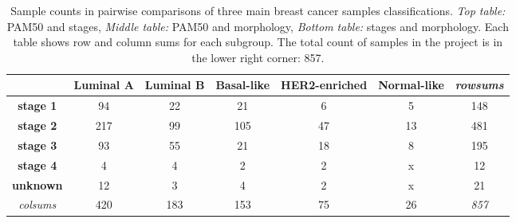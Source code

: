         
                \begin{table}[!h]
                \centering
               \scriptsize
                \caption[Sample counts per each pairwise subgroup in the dataset]{Sample counts in pairwise comparisons of three main breast cancer samples classifications. \textit{Top table:} PAM50 and stages,\textit{ Middle table:} PAM50 and morphology, \textit{Bottom table:} stages and morphology. Each table shows row and column sums for each subgroup. The total count of samples in the project is in the lower right corner: 857.}
                \label{table:counts}      
                \begin{tabular}{ccccccc}
                \multicolumn{1}{l|}{} & \multicolumn{1}{c|}{\textbf{Luminal A}} & \multicolumn{1}{c|}{\textbf{Luminal B}} & \multicolumn{1}{c|}{\textbf{Basal-like}} & \multicolumn{1}{c|}{\textbf{HER2-enriched}} & \multicolumn{1}{c|}{\textbf{Normal-like}} & {\color[HTML]{9B9B9B} \textit{rowsums}} \\ \hline
                \multicolumn{1}{c|}{\textbf{stage 1}} & \multicolumn{1}{c|}{94} & \multicolumn{1}{c|}{22} & \multicolumn{1}{c|}{21} & \multicolumn{1}{c|}{6} & \multicolumn{1}{c|}{5} & \multicolumn{1}{c|}{{\color[HTML]{656565} 148}} \\ \hline
                \multicolumn{1}{c|}{\textbf{stage 2}} & \multicolumn{1}{c|}{217} & \multicolumn{1}{c|}{99} & \multicolumn{1}{c|}{105} & \multicolumn{1}{c|}{47} & \multicolumn{1}{c|}{13} & \multicolumn{1}{c|}{{\color[HTML]{656565} 481}} \\ \hline
                \multicolumn{1}{c|}{\textbf{stage 3}} & \multicolumn{1}{c|}{93} & \multicolumn{1}{c|}{55} & \multicolumn{1}{c|}{21} & \multicolumn{1}{c|}{18} & \multicolumn{1}{c|}{8} & \multicolumn{1}{c|}{{\color[HTML]{656565} 195}} \\ \hline
                \multicolumn{1}{c|}{\textbf{stage 4}} & \multicolumn{1}{c|}{4} & \multicolumn{1}{c|}{4} & \multicolumn{1}{c|}{2} & \multicolumn{1}{c|}{2} & \multicolumn{1}{c|}{{\color[HTML]{656565} x}} & \multicolumn{1}{c|}{{\color[HTML]{656565} 12}} \\ \hline
                \multicolumn{1}{c|}{\textbf{unknown}} & \multicolumn{1}{c|}{12} & \multicolumn{1}{c|}{3} & \multicolumn{1}{c|}{4} & \multicolumn{1}{c|}{2} & \multicolumn{1}{c|}{{\color[HTML]{656565} x}} & \multicolumn{1}{c|}{{\color[HTML]{656565} 21}} \\ \hline
                \multicolumn{1}{c|}{{\color[HTML]{9B9B9B} \textit{colsums}}} & \multicolumn{1}{c|}{{\color[HTML]{656565} 420}} & \multicolumn{1}{c|}{{\color[HTML]{656565} 183}} & \multicolumn{1}{c|}{{\color[HTML]{656565} 153}} & \multicolumn{1}{c|}{{\color[HTML]{656565} 75}} & \multicolumn{1}{c|}{{\color[HTML]{656565} 26}} & \multicolumn{1}{c|}{\textit{857}} \\ \cline{2-7} 

\end{tabular}
\end{table}
